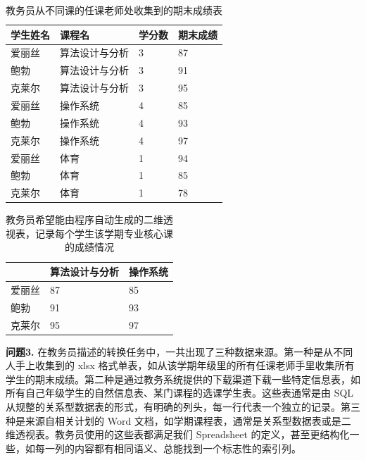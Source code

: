 \documentclass[design, pageheader]{njubachelor}
\begin{document}
\begin{table}[] 
    \centering   
    \begin{tabular}{|l|l|l|l|}
    \hline
    学生姓名 & 课程名     & 学分数 & 期末成绩 \\ \hline
    爱丽丝  & 算法设计与分析 & 3   & 87   \\ \hline
    鲍勃   & 算法设计与分析 & 3   & 91   \\ \hline
    克莱尔  & 算法设计与分析 & 3   & 95   \\ \hline
    爱丽丝  & 操作系统    & 4   & 85   \\ \hline
    鲍勃   & 操作系统    & 4   & 93   \\ \hline
    克莱尔  & 操作系统    & 4   & 97  \\ \hline 
    爱丽丝  & 体育    & 1   & 94   \\ \hline
    鲍勃   & 体育    & 1   & 85   \\ \hline
    克莱尔  & 体育    & 1   & 78  \\ \hline 
    \end{tabular}
    \caption{教务员从不同课的任课老师处收集到的期末成绩表}
    \label{table:regular_scoresheet}
\end{table}

\begin{table}[]
    \centering
    \begin{tabular}{|l|l|l|}
    \hline
        & 算法设计与分析 & 操作系统 \\ \hline
    爱丽丝 & 87      & 85   \\ \hline
    鲍勃  & 91      & 93   \\ \hline
    克莱尔 & 95      & 97   \\ \hline
    \end{tabular}
    \caption{教务员希望能由程序自动生成的二维透视表，记录每个学生该学期专业核心课的成绩情况}
    \label{table:pivot_scoresheet}
\end{table}


{\bfseries 问题3.} 在教务员描述的转换任务中，一共出现了三种数据来源。第一种是从不同人手上收集到的 xlsx 格式单表，如从该学期年级里的所有任课老师手里收集所有学生的期末成绩。第二种是通过教务系统提供的下载渠道下载一些特定信息表，如所有自己年级学生的自然信息表、某门课程的选课学生表。这些表通常是由 SQL 从规整的关系型数据表的形式，有明确的列头，每一行代表一个独立的记录。第三种是来源自相关计划的 Word 文档，如学期课程表，通常是关系型数据表或是二维透视表。教务员使用的这些表都满足我们 Spreadsheet 的定义，甚至更结构化一些，如每一列的内容都有相同语义、总能找到一个标志性的索引列。
\end{document}
